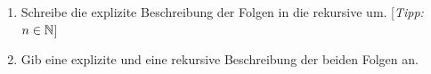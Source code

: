 \documentclass[11pt,oneside]{article}
\begin{document}
\begin{aufgabe}
\begin{enumerate}
			\item Schreibe die explizite Beschreibung der Folgen in die rekursive um. [\textit{Tipp:} $n\in\mathbb{N}$]
			\item Gib eine explizite und eine rekursive Beschreibung der beiden Folgen an.
		\end{enumerate}
	\end{aufgabe}\newpage
\end{document}
